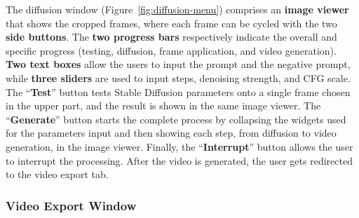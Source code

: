 \documentclass[preprint]{elsarticle}
\begin{document}
The diffusion window (Figure~\ref{fig:diffusion-menu}) comprises an \textbf{image viewer} that 
shows the cropped frames, where each frame can be cycled with the two \textbf{side buttons}. 
The \textbf{two progress bars} respectively indicate the overall and  specific progress (testing, diffusion, frame application, and video generation). \textbf{Two text boxes} allow the users to input the prompt and the negative prompt, while \textbf{three sliders} are used to input steps, denoising strength, and CFG scale. The ``\textbf{Test}'' button tests Stable Diffusion parameters onto a single frame chosen  in the upper part, and the result is shown in the same image viewer. 
The ``\textbf{Generate}'' button starts the complete process by collapsing the widgets used  for the parameters input and then showing each step, from diffusion to video generation, 
in the image viewer. 
Finally, the ``\textbf{Interrupt}'' button allows the user to interrupt the processing.  After the video is generated, the user gets redirected to the video export tab.



\subsubsection{Video Export Window}
\end{document}

